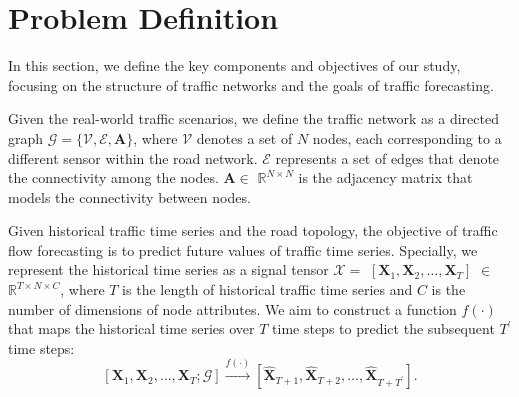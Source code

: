 \section{Problem Definition}
In this section, we define the key components and objectives of our study, focusing on the structure of traffic networks and the goals of traffic forecasting.

\begin{Def}
    Given the real-world traffic scenarios, we define the traffic network as a directed graph $\mathcal{G}=\{\mathcal{V},\mathcal{E},\mathbf{A}\}$, where $\mathcal{V}$ denotes a set of $N$ nodes, each corresponding to a different sensor within the road network. $\mathcal{E}$ represents a set of edges that denote the connectivity among the nodes. $\mathbf{A}$$\in$ $\mathbb{R}^{N\times N}$ is the adjacency matrix that models the connectivity between nodes.
\end{Def}

\begin{Def}
    Given historical traffic time series and the road topology, the objective of traffic flow forecasting is to predict future values of traffic time series. Specially, we represent the historical time series as a signal tensor $\bm{\mathcal{X}} =$ $\left[\mathbf{X}_1,\mathbf{X}_2,\dots,\mathbf{X}_{T}\right]$ $\in$ $\mathbb{R}^{T\times N\times C}$, where $T$ is the length of historical traffic time series and $C$ is the number of dimensions of node attributes. We aim to construct a function $f(\cdot)$ that maps the historical time series over $T$ time steps to predict the subsequent $T^\prime$ time steps:
   \begin{equation}
        \left[\mathbf{X}_{1},\mathbf{X}_{2},\dots,\mathbf{X}_{T};\mathcal{G}\right] \stackrel{f(\cdot)}{\longrightarrow} \left[\mathbf{\hat{X}}_{T+1},\mathbf{\hat{X}}_{T+2},\dots,\mathbf{\hat{X}}_{T+T^\prime}\right].
    \end{equation}
\end{Def}